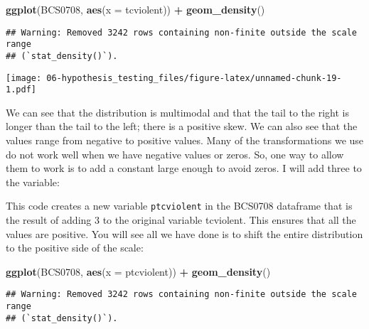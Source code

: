\documentclass[
]{book}
\newenvironment{Shaded}{\begin{snugshade}}{\end{snugshade}}
\newcommand{\AttributeTok}[1]{\textcolor[rgb]{0.13,0.29,0.53}{#1}}
\newcommand{\DecValTok}[1]{\textcolor[rgb]{0.00,0.00,0.81}{#1}}
\newcommand{\FunctionTok}[1]{\textcolor[rgb]{0.13,0.29,0.53}{\textbf{#1}}}
\newcommand{\NormalTok}[1]{#1}
\newcommand{\OtherTok}[1]{\textcolor[rgb]{0.56,0.35,0.01}{#1}}
\newcommand{\SpecialCharTok}[1]{\textcolor[rgb]{0.81,0.36,0.00}{\textbf{#1}}}
\begin{document}
\begin{Shaded}
\begin{Highlighting}[]
\FunctionTok{ggplot}\NormalTok{(BCS0708, }\FunctionTok{aes}\NormalTok{(}\AttributeTok{x =}\NormalTok{ tcviolent)) }\SpecialCharTok{+} 
  \FunctionTok{geom\_density}\NormalTok{()}
\end{Highlighting}
\end{Shaded}

\begin{verbatim}
## Warning: Removed 3242 rows containing non-finite outside the scale range
## (`stat_density()`).
\end{verbatim}

\texttt{[image: 06-hypothesis\_testing\_files/figure-latex/unnamed-chunk-19-1.pdf]}

We can see that the distribution is multimodal and that the tail to the right is longer than the tail to the left; there is a positive skew. We can also see that the values range from negative to positive values. Many of the transformations we use do not work well when we have negative values or zeros. So, one way to allow them to work is to add a constant large enough to avoid zeros. I will add three to the variable:

\begin{Shaded}
\end{Shaded}

This code creates a new variable \texttt{ptcviolent} in the BCS0708 dataframe that is the result of adding 3 to the original variable tcviolent. This ensures that all the values are positive. You will see all we have done is to shift the entire distribution to the positive side of the scale:

\begin{Shaded}
\begin{Highlighting}[]
\FunctionTok{ggplot}\NormalTok{(BCS0708, }\FunctionTok{aes}\NormalTok{(}\AttributeTok{x =}\NormalTok{ ptcviolent)) }\SpecialCharTok{+} 
  \FunctionTok{geom\_density}\NormalTok{()}
\end{Highlighting}
\end{Shaded}

\begin{verbatim}
## Warning: Removed 3242 rows containing non-finite outside the scale range
## (`stat_density()`).
\end{verbatim}
\end{document}
